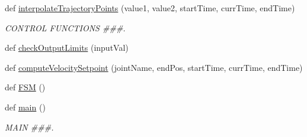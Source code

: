 \begin{DoxyCompactItemize}
\item 
def \mbox{\hyperlink{namespacepedal__simulation_a931cf3b3417734fed291dd2882f88842}{interpolate\+Trajectory\+Points}} (value1, value2, start\+Time, curr\+Time, end\+Time)
\begin{DoxyCompactList}\small\item\em C\+O\+N\+T\+R\+OL F\+U\+N\+C\+T\+I\+O\+NS \#\#\#. \end{DoxyCompactList}\item 
def \mbox{\hyperlink{namespacepedal__simulation_a880354a926adb358b5ef68766f42639b}{check\+Output\+Limits}} (input\+Val)
\item 
def \mbox{\hyperlink{namespacepedal__simulation_a882041c9627d3986d4a997a1d4aac41a}{compute\+Velocity\+Setpoint}} (joint\+Name, end\+Pos, start\+Time, curr\+Time, end\+Time)
\item 
def \mbox{\hyperlink{namespacepedal__simulation_a53867c33184116716ccf5ffc62619a39}{F\+SM}} ()
\item 
def \mbox{\hyperlink{namespacepedal__simulation_a727e35b81726e63028964cefc65d48c5}{main}} ()
\begin{DoxyCompactList}\small\item\em M\+A\+IN \#\#\#. \end{DoxyCompactList}\end{DoxyCompactItemize}
